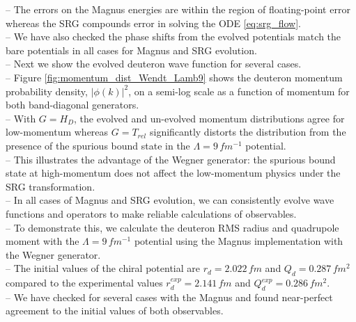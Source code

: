 \documentclass[preprintnumbers,floatfix,aps,prc,preprint,nofootinbib]{revtex4-1}
\begin{document}
-- The errors on the Magnus energies are within the region of floating-point error whereas the SRG compounds error in solving the ODE \ref{eq:srg_flow}.
\\
-- We have also checked the phase shifts from the evolved potentials match the bare potentials in all cases for Magnus and SRG evolution.
\\ 
-- Next we show the evolved deuteron wave function for several cases.
\\
-- Figure \ref{fig:momentum_dist_Wendt_Lamb9} shows the deuteron momentum probability density, $|\phi(k)|^2$, on a semi-log scale as a function of momentum for both band-diagonal generators.
\\
-- With $G=H_D$, the evolved and un-evolved momentum distributions agree for low-momentum whereas $G=T_{rel}$ significantly distorts the distribution from the presence of the spurious bound state in the $\Lambda=9 \, fm^{-1}$ potential.
\\
-- This illustrates the advantage of the Wegner generator: the spurious bound state at high-momentum does not affect the low-momentum physics under the SRG transformation.
\\
-- In all cases of Magnus and SRG evolution, we can consistently evolve wave functions and operators to make reliable calculations of observables.
\\
-- To demonstrate this, we calculate the deuteron RMS radius and quadrupole moment with the $\Lambda=9 \, fm^{-1}$ potential using the Magnus implementation with the Wegner generator.
\\
-- The initial values of the chiral potential are $r_d = 2.022 \, fm$ and $Q_d = 0.287 \, fm^2$ compared to the experimental values $r_d^{exp} = 2.141 \, fm$ and $Q_d^{exp} = 0.286 \, fm^2$. 
\\
-- We have checked for several cases with the Magnus and found near-perfect agreement to the initial values of both observables.
\\
\end{document}
